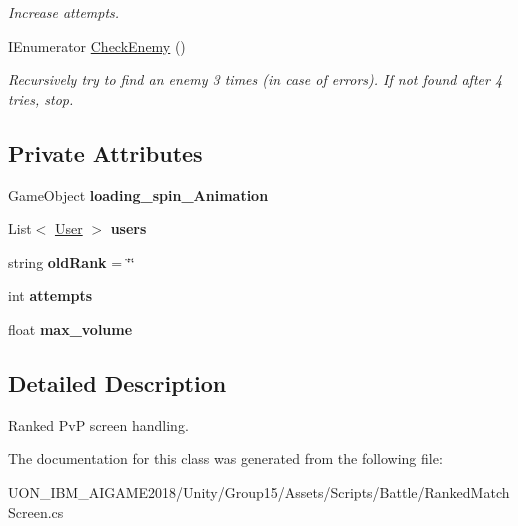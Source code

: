 \begin{DoxyCompactItemize}
\begin{DoxyCompactList}\small\item\em Increase attempts. \end{DoxyCompactList}\item 
\mbox{\label{class_ranked_match_screen_ad61c0cdc08dd280707aa5e4bb29bdb58}} 
I\+Enumerator \mbox{\hyperlink{class_ranked_match_screen_ad61c0cdc08dd280707aa5e4bb29bdb58}{Check\+Enemy}} ()
\begin{DoxyCompactList}\small\item\em Recursively try to find an enemy 3 times (in case of errors). If not found after 4 tries, stop. \end{DoxyCompactList}\end{DoxyCompactItemize}
\subsection*{Private Attributes}
\begin{DoxyCompactItemize}
\item 
\mbox{\label{class_ranked_match_screen_a07964a0e688df7fac3544ecbacdb1b38}} 
Game\+Object {\bfseries loading\+\_\+spin\+\_\+\+Animation}
\item 
\mbox{\label{class_ranked_match_screen_a58808e8b95d7ceae1e2fded90b49a717}} 
List$<$ \mbox{\hyperlink{class_user}{User}} $>$ {\bfseries users}
\item 
\mbox{\label{class_ranked_match_screen_a9b7d719703c76fa997c55af096f1f515}} 
string {\bfseries old\+Rank} = \char`\"{}\char`\"{}
\item 
\mbox{\label{class_ranked_match_screen_a98589ae73b128bf087585b9992e42b55}} 
int {\bfseries attempts}
\item 
\mbox{\label{class_ranked_match_screen_a543fa182be7d42093f3da8924e37802e}} 
float {\bfseries max\+\_\+volume}
\end{DoxyCompactItemize}


\subsection{Detailed Description}
Ranked PvP screen handling. 

The documentation for this class was generated from the following file\+:\begin{DoxyCompactItemize}
\item 
U\+O\+N\+\_\+\+I\+B\+M\+\_\+\+A\+I\+G\+A\+M\+E2018/\+Unity/\+Group15/\+Assets/\+Scripts/\+Battle/Ranked\+Match\+Screen.\+cs\end{DoxyCompactItemize}
